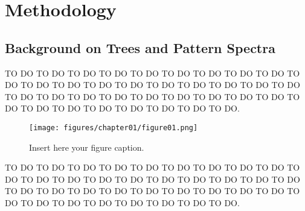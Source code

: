 \hypertarget{methodology}{%
\chapter{Methodology}\label{methodology}}


\hypertarget{trees-ps}{%
\section{Background on Trees and Pattern Spectra}\label{trees-ps}}

TO DO TO DO TO DO TO DO TO DO TO DO TO DO TO DO TO DO TO DO TO DO TO DO TO DO TO DO TO DO TO DO TO DO TO DO TO DO TO DO TO DO TO DO TO DO TO DO TO DO TO DO TO DO TO DO TO DO TO DO TO DO TO DO TO DO TO DO TO DO TO DO.
\begin{figure}[!h]
    \centering
    \texttt{[image: figures/chapter01/figure01.png]}
    \caption{Insert here your figure caption.}
    \label{fig:figure01}
\end{figure}

TO DO TO DO TO DO TO DO TO DO TO DO TO DO TO DO TO DO TO DO TO DO TO DO TO DO TO DO TO DO TO DO TO DO TO DO TO DO TO DO TO DO TO DO TO DO TO DO TO DO TO DO TO DO TO DO TO DO TO DO TO DO TO DO TO DO TO DO TO DO TO DO.



